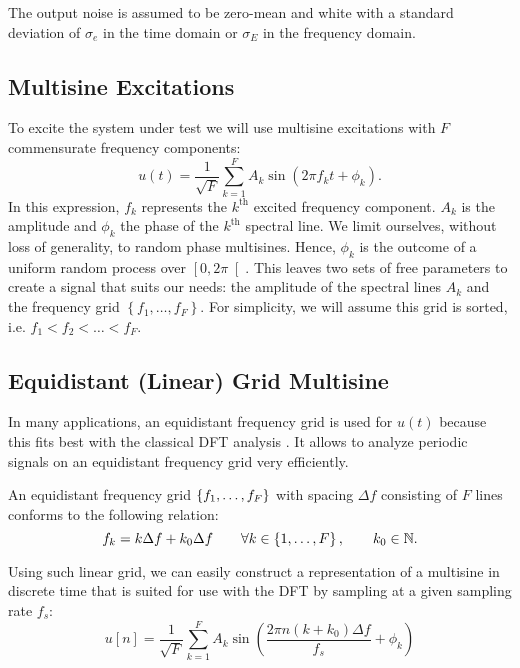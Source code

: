   The output noise is assumed to be zero-mean and white with a
  standard deviation of $\sigma_e$ in the time domain or $\sigma_E$ in the frequency domain.


\subsection{Multisine Excitations}
  To excite the system under test we will use multisine excitations \citep{Pintelon2001} with $F$ commensurate frequency components:
  \begin{equation}
    u \left( t\right) = \frac{1}{\sqrt{F}}
   \sum_{k=1}^{F} 
     A_k 
     \sin 
       \left(2\pi f_k t + \phi_k \right)
  \text{.}
  \label{eq:MultisineCT}
  \end{equation}
  In this expression, $f_k$ represents the $k^{\text{th}}$ excited frequency component.
  $A_k$ is the amplitude and $\phi_k$ the phase of the $k^{\text{th}}$ spectral line.
  We limit ourselves, without loss of generality, to random phase multisines.
  Hence, $\phi_k$ is the outcome of a uniform random process over $\left[0,2\pi\right[$.
  This leaves two sets of free parameters to create a signal that suits our needs:
    the amplitude of the spectral lines $A_k$ and
    the frequency grid $\left\{f_1, \ldots, f_F \right\}$.
  For simplicity, we will assume this grid is sorted, i.e. $f_1 < f_2 < \ldots < f_F$.

  
\subsection{Equidistant (Linear) Grid Multisine}
  In many applications, an equidistant frequency grid is used for $u\left( t\right) $ because this fits best with the classical DFT analysis \citep{OppenheimDT,Mandal2007}. It allows to analyze periodic signals on an equidistant frequency grid very efficiently.
  
  An equidistant frequency grid $\left\{f_1, \ldots, f_F\right\}$ with spacing $\Delta f$
  consisting of $F$ lines conforms to the following relation:
  \begin{equation}
    f_k = k \Delta f + k_0 \Delta f
    \qquad \forall k \in \left\{1,\ldots,F\right\},
    \qquad k_0 \in \mathbb{N}
    \text{.}
  \label{eq:linGrid}
  \end{equation}
  
  Using such linear grid, we can easily construct a representation of a multisine
  in discrete time that is suited for use with the DFT by sampling at a given sampling rate $f_s$:
  \begin{equation}
     u \left[ n\right] = \frac{1}{\sqrt{F}}
     \sum_{k=1}^{F} 
       A_k 
       \sin 
         \left(\frac{2\pi n \left( k + k_0 \right) \Delta f}{f_s} + \phi_k \right)
    \label{eq:MultiSineDT}
  \end{equation}
  
